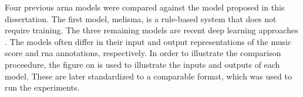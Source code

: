 
Four previous \gls{arna} models were compared against the
model proposed in this dissertation. The first model,
\gls{melisma}, is a rule-based system that does not require
training. The three remaining models are recent deep
learning approaches \parencite{chen2021attend,
micchi2021deep, mcleod2021modular}. The models often differ
in their input and output representations of the music score
and \gls{rna} annotations, respectively. In order to
illustrate the comparison proceedure, the figure on
 is used to illustrate
the inputs and outputs of each model. These are later
standardized to a comparable format, which was used to run
the experiments.
